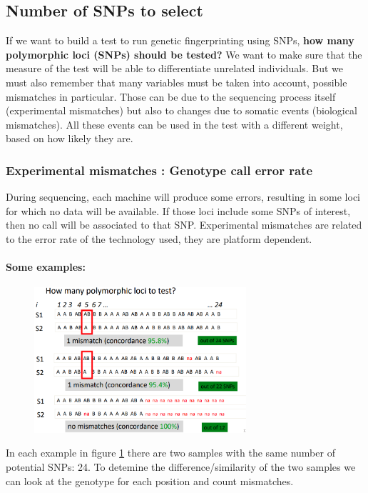 \subsection{Number of SNPs to select} 

If we want to build a test to run genetic fingerprinting using SNPs, \textbf{how many polymorphic loci (SNPs) should be tested?} 
We want to make sure that the measure of the test will be able to differentiate unrelated individuals. 
But we must also remember that many variables must be taken into account, possible mismatches in particular. Those can be due to the sequencing process itself (experimental mismatches) but also to changes due to somatic events (biological mismatches). All these events can be used in the test with a different weight, based on how likely they are. 


\subsubsection{Experimental mismatches : Genotype call error rate}

During sequencing, each machine will produce some errors, resulting in some loci for which no data will be available. If those loci include some SNPs of interest, then no call will be associated to that SNP. 
Experimental mismatches are related to the error rate of the technology used, they are platform dependent. 

\paragraph*{Some examples:}

\begin{figure}
	\centering
	\includegraphics[width=0.7\textwidth]{SNP.PNG}
	\caption{\label{fig:SNP}}
\end{figure}

In each example in figure \ref{fig:SNP} there are two samples with the same number of potential SNPs: 24. To detemine the difference/similarity of the two samples we can look at the genotype for each position and count mismatches.


